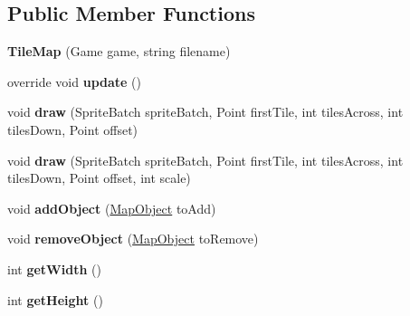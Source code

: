 \subsection*{Public Member Functions}
\begin{DoxyCompactItemize}
\item 
\hypertarget{class_simple_r_p_g_1_1_tile_map_aff7e26a8eba6574dc7e44365e0f80116}{{\bfseries Tile\-Map} (Game game, string filename)}\label{class_simple_r_p_g_1_1_tile_map_aff7e26a8eba6574dc7e44365e0f80116}

\item 
\hypertarget{class_simple_r_p_g_1_1_tile_map_ac0c1ecb56bca71736fd6a66735c56500}{override void {\bfseries update} ()}\label{class_simple_r_p_g_1_1_tile_map_ac0c1ecb56bca71736fd6a66735c56500}

\item 
\hypertarget{class_simple_r_p_g_1_1_tile_map_a27f6d71982a60c58caf00cd909169024}{void {\bfseries draw} (Sprite\-Batch sprite\-Batch, Point first\-Tile, int tiles\-Across, int tiles\-Down, Point offset)}\label{class_simple_r_p_g_1_1_tile_map_a27f6d71982a60c58caf00cd909169024}

\item 
\hypertarget{class_simple_r_p_g_1_1_tile_map_aaf5d4d165283c58cce31ebf20bedbb74}{void {\bfseries draw} (Sprite\-Batch sprite\-Batch, Point first\-Tile, int tiles\-Across, int tiles\-Down, Point offset, int scale)}\label{class_simple_r_p_g_1_1_tile_map_aaf5d4d165283c58cce31ebf20bedbb74}

\item 
\hypertarget{class_simple_r_p_g_1_1_tile_map_a3b9d0342243c91c45a8cd4017131019b}{void {\bfseries add\-Object} (\hyperlink{class_simple_r_p_g_1_1_map_object}{Map\-Object} to\-Add)}\label{class_simple_r_p_g_1_1_tile_map_a3b9d0342243c91c45a8cd4017131019b}

\item 
\hypertarget{class_simple_r_p_g_1_1_tile_map_a5d6e4c6a870b8a57623b54dcc54102f8}{void {\bfseries remove\-Object} (\hyperlink{class_simple_r_p_g_1_1_map_object}{Map\-Object} to\-Remove)}\label{class_simple_r_p_g_1_1_tile_map_a5d6e4c6a870b8a57623b54dcc54102f8}

\item 
\hypertarget{class_simple_r_p_g_1_1_tile_map_a8aee7054993b88b1f0f668a88b3879df}{int {\bfseries get\-Width} ()}\label{class_simple_r_p_g_1_1_tile_map_a8aee7054993b88b1f0f668a88b3879df}

\item 
\hypertarget{class_simple_r_p_g_1_1_tile_map_a021ebfc7b0614b0af61d3a576e421b50}{int {\bfseries get\-Height} ()}\label{class_simple_r_p_g_1_1_tile_map_a021ebfc7b0614b0af61d3a576e421b50}


\end{DoxyCompactItemize}
